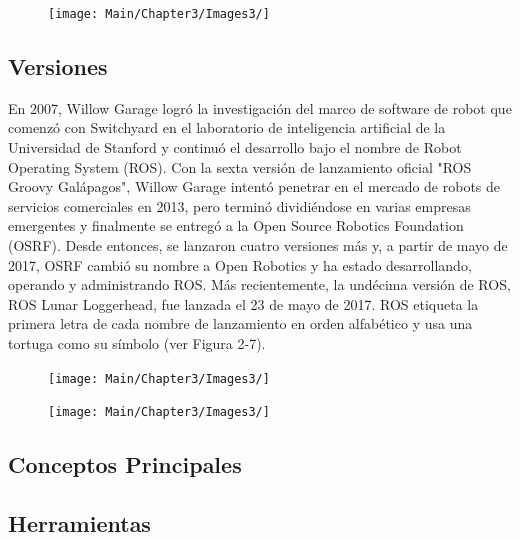             \begin{figure}[htb]
            \centering
            \texttt{[image: Main/Chapter3/Images3/]}
            \caption{}
            \label{f:Cap3-5_estadisticas_9}
            \end{figure} 
    
        \newpage

    \subsection{Versiones}
            En 2007, Willow Garage logró la investigación del marco de software de robot que comenzó con Switchyard en el laboratorio de inteligencia artificial de la Universidad de Stanford y continuó el desarrollo bajo el nombre de Robot Operating System (ROS). Con la sexta versión de lanzamiento oficial "ROS Groovy Galápagos", Willow Garage intentó penetrar en el mercado de robots de servicios comerciales en 2013, pero terminó dividiéndose en varias empresas emergentes y finalmente se entregó a la Open Source Robotics Foundation (OSRF). Desde entonces, se lanzaron cuatro versiones más y, a partir de mayo de 2017, OSRF cambió su nombre a Open Robotics y ha estado desarrollando, operando y administrando ROS. Más recientemente, la undécima versión de ROS, ROS Lunar Loggerhead, fue lanzada el 23 de mayo de 2017. ROS etiqueta la primera letra de cada nombre de lanzamiento en orden alfabético y usa una tortuga como su símbolo (ver Figura 2-7).
            
            \begin{figure}[htb]
            \centering
            \texttt{[image: Main/Chapter3/Images3/]}
            \caption{}
            \label{f:Cap3-5_estadisticas_10}
            \end{figure} 
    
            \begin{figure}[htb]
            \centering
            \texttt{[image: Main/Chapter3/Images3/]}
            \caption{}
            \label{f:Cap3-5_estadisticas_11}
            \end{figure} 
    
    \newpage
    
    \subsection{Conceptos Principales}

    \newpage

    \subsection{Herramientas}


